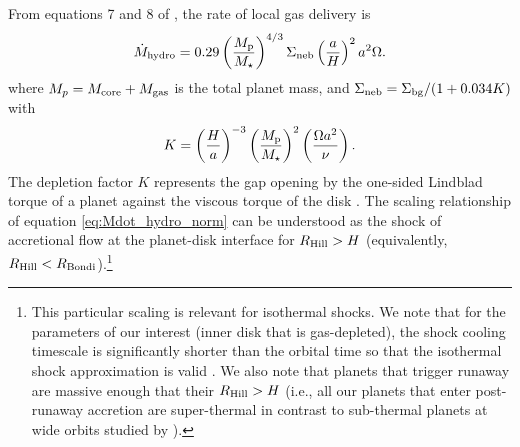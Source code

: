 \documentclass[twocolumn]{aastex631}
\begin{document}
From equations 7 and 8 of \citet{Tanigawa16}, the rate of local gas delivery is
%
\begin{equation}
\dot{M}_{\rm hydro} = 0.29 \left(\frac{M_{\rm p}}{M_\star}\right)^{4/3} \Sigma_{\rm neb} \left(\frac{a}{H}\right)^2 a^2 \Omega.
\label{eq:Mdot_hydro_norm}
\end{equation}
%
where $M_p = M_{\rm core} + M_{\rm gas}$ is the total planet mass, and $\Sigma_{\rm neb} = \Sigma_{\rm bg}/(1+0.034K)$ with
%
\begin{equation}
    K = \left(\frac{H}{a}\right)^{-3}\left(\frac{M_{\rm p}}{M_\star}\right)^2\left(\frac{\Omega a^2}{\nu}\right).
    \label{eq:K}
\end{equation}
%
The depletion factor $K$ represents the gap opening by the one-sided Lindblad torque of a planet against the viscous torque of the disk \citep[e.g.,][]{Duffell13,Fung14}. The scaling relationship of equation \ref{eq:Mdot_hydro_norm} can be understood as the shock of accretional flow at the planet-disk interface for $R_{\rm Hill} > H$ (equivalently, $R_{\rm Hill} < R_{\rm Bondi}$).\footnote{This particular scaling is relevant for isothermal shocks. We note that for the parameters of our interest (inner disk that is gas-depleted), the shock cooling timescale is significantly shorter than the orbital time so that the isothermal shock approximation is valid \citep[see][their equation 8]{Lee19}. We also note that planets that trigger runaway are massive enough that their $R_{\rm Hill} > H$ (i.e., all our planets that enter post-runaway accretion are super-thermal in contrast to sub-thermal planets at wide orbits studied by \citet{Ginzburg19}).}
\end{document}
